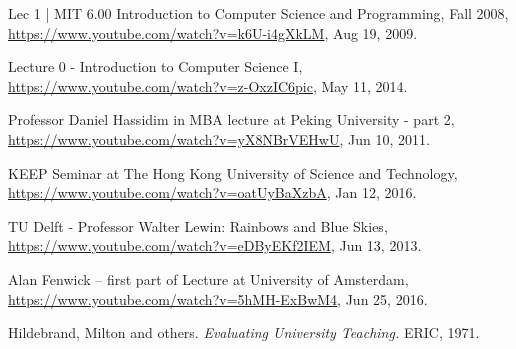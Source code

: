 \documentclass[journal]{IEEEtran}
\begin{document}


%
%
%
\begin{thebibliography}{1}

Lec 1 | MIT 6.00 Introduction to Computer Science and Programming, Fall 2008, \url{https://www.youtube.com/watch?v=k6U-i4gXkLM}, Aug 19, 2009.

Lecture 0 - Introduction to Computer Science I, \url{https://www.youtube.com/watch?v=z-OxzIC6pic}, May 11, 2014.

Professor Daniel Hassidim in MBA lecture at Peking University - part 2, \url{https://www.youtube.com/watch?v=yX8NBrVEHwU}, Jun 10, 2011.

KEEP Seminar at The Hong Kong University of Science and Technology, \url{https://www.youtube.com/watch?v=oatUyBaXzbA}, Jan 12, 2016.

TU Delft - Professor Walter Lewin: Rainbows and Blue Skies, \url{https://www.youtube.com/watch?v=eDByEKf2IEM}, Jun 13, 2013.

Alan Fenwick – first part of Lecture at University of Amsterdam, \url{https://www.youtube.com/watch?v=5hMH-ExBwM4}, Jun 25, 2016.

Hildebrand, Milton and others.
\textit{Evaluating University Teaching.}
ERIC, 1971.

\end{thebibliography}

% 
\end{document}
